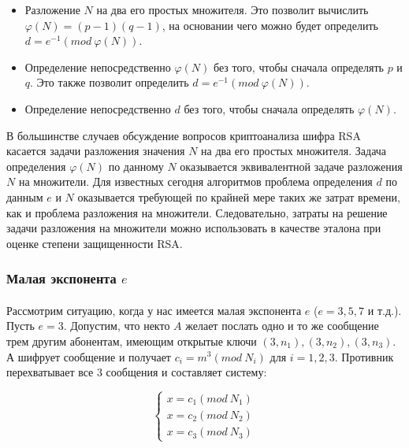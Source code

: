     \begin{itemize}
     \item Разложение $N$ на два его простых множителя. Это позволит вычислить $\varphi(N) = (p - 1)(q - 1)$, на основании чего можно будет 
     определить $d = e^{-1}(mod \: \varphi(N))$.
     \item Определение непосредственно $\varphi(N)$ без того, чтобы сначала определять $p$ и $q$. Это также позволит
     определить $d = e^{-1}(mod \: \varphi(N))$.
     \item Определение непосредственно $d$ без того, чтобы сначала определять $\varphi(N)$.
    \end{itemize}
    
  В большинстве случаев обсуждение вопросов криптоанализа шифра RSA касается задачи разложения значения $N$ на два его простых множителя. 
  Задача определения $\varphi(N)$ по данному $N$ оказывается эквивалентной задаче разложения $N$ на множители. Для известных сегодня алгоритмов 
  проблема определения $d$ по данным $e$ и $N$ оказывается требующей по крайней мере таких же затрат времени, как и проблема разложения на 
  множители. Следовательно, затраты на решение задачи разложения на множители можно использовать в качестве эталона при оценке степени 
  защищенности RSA.

\subsubsection{Малая экспонента $e$}

  \paragraph{} Рассмотрим ситуацию, когда у нас имеется малая экспонента $e$ ($e = 3,5,7$ и т.д.). Пусть $e=3$. Допустим, что некто
  $A$ желает послать одно и то же сообщение трем другим абонентам, имеющим открытые ключи $(3, n_1), (3, n_2), (3, n_3)$. А шифрует 
  сообщение и получает $c_i = m^3(mod \: N_i)$ для $i = 1, 2, 3$. Противник перехватывает все 3 сообщения и составляет систему:
  
    \begin{equation}
    	\begin{cases}
    	   x = c_1(mod \: N_1) \\
    	   x = c_2(mod \: N_2) \\
    	   x = c_3(mod \: N_3)
    	\end{cases}    
    \end{equation}

